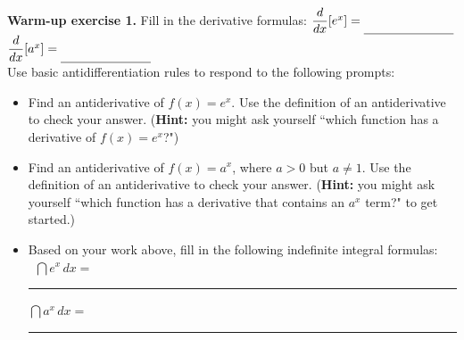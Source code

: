 \documentclass[10pt]{article}
\begin{document}
\hrulefill

\




\begin{center}
\end{center}

{\bf\color{blue}Warm-up exercise 1.} Fill in the derivative formulas: \hfill $\dfrac{d}{dx}[e^x] = \rule[-8pt]{1in}{0.4pt}$ \hfill $\dfrac{d}{dx}[a^x] = \rule[-8pt]{1in}{0.4pt}$ \hfill\,\\

{} Use basic antidifferentiation rules to respond to the following prompts:

\begin{itemize}
\item[(a)] Find an antiderivative of $f(x)=e^x$. Use the definition of an antiderivative to check your answer. ({\bf Hint:} you might ask yourself ``which function has a derivative of $f(x)=e^x$?")

    \vfill

\item[(b)] Find an antiderivative of $f(x)=a^x$, where $a>0$ but $a\not=1$. Use the definition of an antiderivative to check your answer. ({\bf Hint:} you might ask yourself ``which function has a derivative that contains an $a^x$ term?" to get started.)

    \vfill

\item[(c)] Based on your work above, fill in the following indefinite integral formulas:\\

\,\hfill
$\dint e^x\,dx = $\rule[-8pt]{1.5in}{0.4pt}
\hfill
$\dint a^x\,dx = $\rule[-8pt]{1.5in}{0.4pt}
\hfill\,

\end{itemize}



\newpage%

\begin{center}
\end{center}
\end{document}
